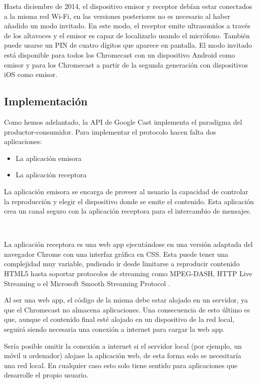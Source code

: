 Hasta diciembre de 2014, el dispositivo emisor y receptor debían estar conectados a la misma red Wi-Fi, en las versiones posteriores no es necesario al haber añadido un modo invitado.
En este modo, el receptor emite ultrasonidos a través de los altavoces y el emisor es capaz de localizarlo usando el micrófono.
También puede usarse un PIN de cuatro dígitos que aparece en pantalla.
El modo invitado está disponible para todos los Chromecast con un dispositivo Android como emisor y para los Chromecast a partir de la segunda generación con dispositivos iOS como emisor.


\subsection{Implementación}

Como hemos adelantado, la API de Google Cast implementa el paradigma del productor-consumidor. Para implementar el protocolo hacen falta dos aplicaciones:

\begin{itemize}
	\item La aplicación emisora 
	\item La aplicación receptora 
\end{itemize}
La aplicación emisora se encarga de proveer al usuario la capacidad de controlar la reproducción y elegir el dispositivo donde se emite el contenido.
Esta aplicación crea un canal seguro con la aplicación receptora para el intercambio de mensajes.

\

La aplicación receptora es una web app ejecutándose en una versión adaptada del navegador Chrome con una interfaz gráfica en CSS.
Esta puede tener una complejidad muy variable, pudiendo ir desde limitarse a reproducir contenido HTML5 hasta soportar protocolos de streaming como MPEG-DASH, HTTP Live Streaming o el Microsoft Smooth Streaming Protocol \cite{CastSDK}.

Al ser una web app, el código de la misma debe estar alojado en un servidor, ya que el Chromecast no almacena aplicaciones.
Una consecuencia de esto último es que, aunque el contenido final esté alojado en un dispositivo de la red local, seguirá siendo necesaria una conexión a internet para cargar la web app. 

Sería posible omitir la conexión a internet si el servidor local (por ejemplo, un móvil u ordenador) alojase la aplicación web, de esta forma solo se necesitaría una red local.
En cualquier caso esto solo tiene sentido para aplicaciones que desarrolle el propio usuario.

